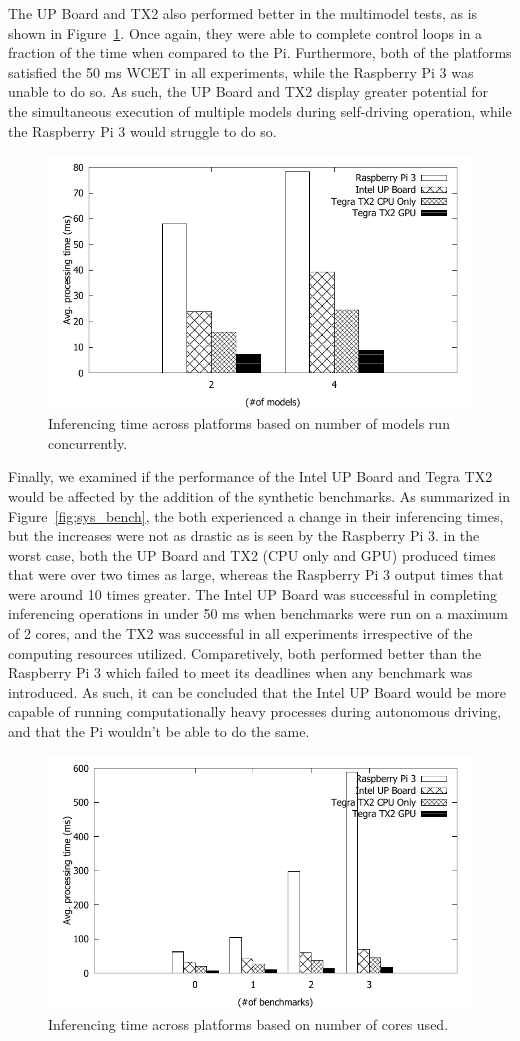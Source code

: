 The UP Board and TX2 also performed better in the multimodel tests, 
as is shown in Figure~\ref{fig:sys_model}. Once again, they were able 
to complete control loops in a fraction of the time when compared to 
the Pi. Furthermore, both of the platforms satisfied the 50 ms WCET 
in all experiments, while the Raspberry Pi 3 was unable to do so. As 
such, the UP Board and TX2 display greater potential for the 
simultaneous execution of multiple models during self-driving 
operation, while the Raspberry Pi 3 would struggle to do so.

\begin{figure}[h]
  \centering
  \includegraphics[width=.5\textwidth]{figs/compare_model}
  \caption{Inferencing time across platforms based on number of 
models run concurrently.}
  \label{fig:sys_model}
\end{figure}

Finally, we examined if the performance of the Intel UP Board and 
Tegra TX2 would be affected by the addition of the synthetic 
benchmarks. As summarized in Figure~\ref{fig;sys_bench}, the both 
experienced a change in their inferencing times, but the increases 
were not as drastic as is seen by the Raspberry Pi 3. in the worst 
case, both the UP Board and TX2 (CPU only and GPU) produced times 
that were over two times as large, whereas the Raspberry Pi 3 output 
times that were around 10 times greater. The Intel UP Board was 
successful in completing inferencing operations in under 50 ms when 
benchmarks were run on a maximum of 2 cores, and the TX2 was 
successful in all experiments irrespective of the computing resources 
utilized. Comparetively, both performed better than the Raspberry Pi 
3 which failed to meet its deadlines when any benchmark was 
introduced. As such, it can be concluded that the Intel UP Board 
would be more capable of running computationally heavy processes 
during autonomous driving, and that the Pi wouldn't be able to do the 
same.

\begin{figure}[h]
  \centering
  \includegraphics[width=.5\textwidth]{figs/compare_benchmark}
  \caption{Inferencing time across platforms based on number of cores 
used.}
  \label{fig:sys_bench}
\end{figure} 

